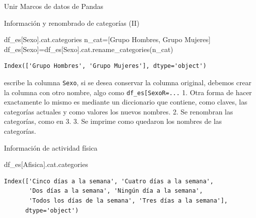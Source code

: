 \documentclass[
  ignorenonframetext,
  aspectratio=169,
  spanish,
]{beamer}
\newenvironment{Shaded}{\begin{snugshade}}{\end{snugshade}}
\newcommand{\NormalTok}[1]{\textcolor[rgb]{0.00,0.23,0.31}{#1}}
\newcommand{\OperatorTok}[1]{\textcolor[rgb]{0.37,0.37,0.37}{#1}}
\newcommand{\StringTok}[1]{\textcolor[rgb]{0.13,0.47,0.30}{#1}}
\newcommand*\circled[1]{\tikz[baseline=(char.base)]{
          \node[shape=circle,draw,inner sep=1pt] (char) {{\scriptsize#1}};}}
\begin{document}
\begin{frame}[fragile]{Unir Marcos de datos de Pandas}
\begin{block}{Información y renombrado de categorías (II)}
\label{informaciuxf3n-y-renombrado-de-categoruxedas-ii-1}
\label{annotated-cell-57}%
\begin{Shaded}
\begin{Highlighting}[]
\NormalTok{df\_es[}\StringTok{\textquotesingle{}Sexo\textquotesingle{}}\NormalTok{].cat.categories }\hspace*{\fill}\NormalTok{\circled{1}}
\NormalTok{n\_cat}\OperatorTok{=}\NormalTok{[}\StringTok{\textquotesingle{}Grupo Hombres\textquotesingle{}}\NormalTok{, }\StringTok{\textquotesingle{}Grupo Mujeres\textquotesingle{}}\NormalTok{] }\hspace*{\fill}\NormalTok{\circled{2}}
\NormalTok{df\_es[}\StringTok{\textquotesingle{}Sexo\textquotesingle{}}\NormalTok{]}\OperatorTok{=}\NormalTok{df\_es[}\StringTok{\textquotesingle{}Sexo\textquotesingle{}}\NormalTok{].cat.rename\_categories(n\_cat) }\hspace*{\fill}\NormalTok{\circled{3}}
\end{Highlighting}
\end{Shaded}

\begin{verbatim}
Index(['Grupo Hombres', 'Grupo Mujeres'], dtype='object')
\end{verbatim}

escribe la columna \texttt{Sexo}, si se desea conservar la columna
original, debemos crear la columna con otro nombre, algo como
\texttt{df\_es{[}\textquotesingle{}SexoR\textquotesingle{}{]}=...} 1.
Otra forma de hacer exactamente lo mismo es mediante un diccionario que
contiene, como claves, las categorías actuales y como valores los nuevos
nombres. 2. Se renombran las categorías, como en 3. 3. Se imprime como
quedaron los nombres de las categorías.
\end{block}

\begin{block}{Información de actividad física}
\label{informaciuxf3n-de-actividad-fuxedsica}
\begin{Shaded}
\begin{Highlighting}[]
\NormalTok{df\_es[}\StringTok{\textquotesingle{}Afisica\textquotesingle{}}\NormalTok{].cat.categories }
\end{Highlighting}
\end{Shaded}

\begin{verbatim}
Index(['Cinco días a la semana', 'Cuatro días a la semana',
       'Dos días a la semana', 'Ningún día a la semana',
       'Todos los días de la semana', 'Tres días a la semana'],
      dtype='object')
\end{verbatim}
\end{block}


\end{frame}
\end{document}
